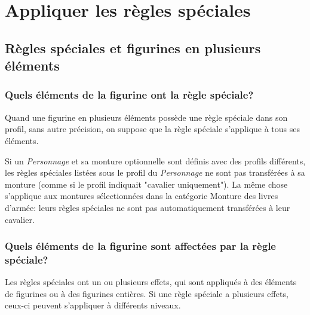 \section{Appliquer les règles spéciales}

\subsection{Règles spéciales et figurines en plusieurs éléments}

\subsubsection*{Quels éléments de la figurine ont la règle spéciale?}

Quand une figurine en plusieurs éléments possède une règle spéciale dans son profil, sans autre précision, on suppose que la règle spéciale s'applique à tous ses éléments.

Si un \emph{Personnage} et sa monture optionnelle sont définis avec des profils différents, les règles spéciales listées sous le profil du \emph{Personnage} ne sont pas transférées à sa monture (comme si le profil indiquait "cavalier uniquement"). La même chose s'applique aux montures sélectionnées dans la catégorie Monture des livres d'armée: leurs règles spéciales ne sont pas automatiquement transférées à leur cavalier.

\subsubsection*{Quels éléments de la figurine sont affectées par la règle spéciale?}

Les règles spéciales ont un ou plusieurs effets, qui sont appliqués à des éléments de figurines ou à des figurines entières. Si une règle spéciale a plusieurs effets, ceux-ci peuvent s'appliquer à différents niveaux.

